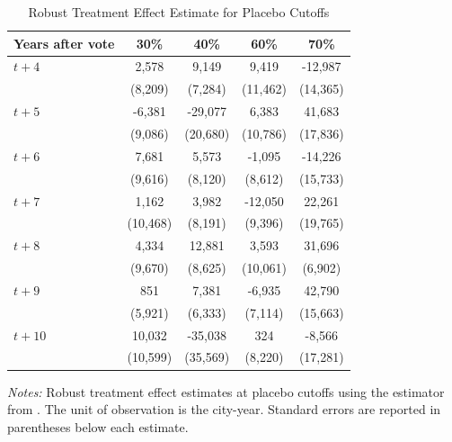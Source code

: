 \begin{table}[H]
    \centering
    \caption{Robust Treatment Effect Estimate for Placebo Cutoffs}
    \label{tab:placebo_cutoffs}
    \begin{threeparttable}
    \begin{minipage}{\linewidth}
    \centering
    \begin{tabular}{p{3cm}cccc}
        \hline
        Years after vote & 30\% & 40\% & 60\% & 70\% \\
        \hline
        $t + 4$ & 2,578 & 9,149 & 9,419 & -12,987 \\
                & (8,209) & (7,284) & (11,462) & (14,365) \\
        $t + 5$ & -6,381 & -29,077 & 6,383 & 41,683 \\
                & (9,086) & (20,680) & (10,786) & (17,836) \\
        $t + 6$ & 7,681 & 5,573 & -1,095 & -14,226 \\
                & (9,616) & (8,120) & (8,612) & (15,733) \\
        $t + 7$ & 1,162 & 3,982 & -12,050 & 22,261 \\
                & (10,468) & (8,191) & (9,396) & (19,765) \\
        $t + 8$ & 4,334 & 12,881 & 3,593 & 31,696 \\
                & (9,670) & (8,625) & (10,061) & (6,902) \\
        $t + 9$ & 851 & 7,381 & -6,935 & 42,790 \\
                & (5,921) & (6,333) & (7,114) & (15,663) \\
        $t + 10$ & 10,032 & -35,038 & 324 & -8,566 \\
                 & (10,599) & (35,569) & (8,220) & (17,281) \\
        \hline
    \end{tabular}
    \vspace{0.5em}
    \begin{tablenotes}[flushleft]
        \small
        \item \textit{Notes:} Robust treatment effect estimates at placebo cutoffs using the estimator from \cite{calonico2017rdrobust}. The unit of observation is the city-year. Standard errors are reported in parentheses below each estimate.
    \end{tablenotes}
    \end{minipage}
    \end{threeparttable}
\end{table}



